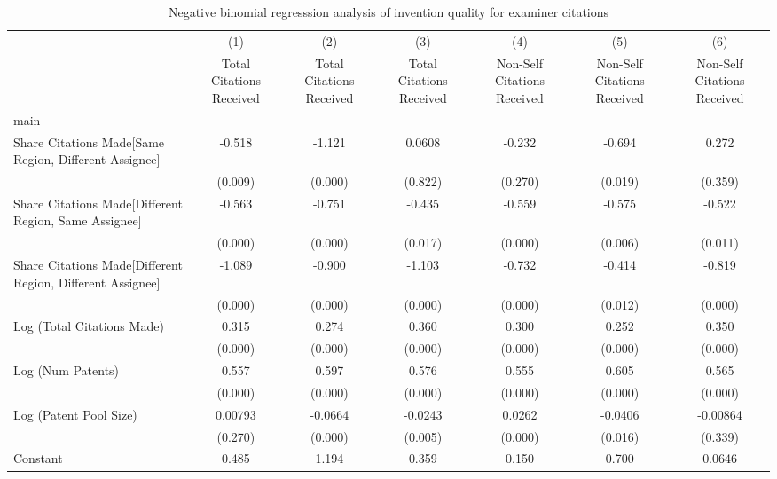 \begin{table}[htbp]\centering \caption{Negative binomial regresssion analysis of invention quality for examiner citations  \label{e.model123192021}} \begin{tabular}{l*{6}{c}} \hline\hline
                &\multicolumn{1}{c}{(1)}&\multicolumn{1}{c}{(2)}&\multicolumn{1}{c}{(3)}&\multicolumn{1}{c}{(4)}&\multicolumn{1}{c}{(5)}&\multicolumn{1}{c}{(6)}\\
                &\multicolumn{1}{c}{Total Citations Received}&\multicolumn{1}{c}{Total Citations Received}&\multicolumn{1}{c}{Total Citations Received}&\multicolumn{1}{c}{Non-Self Citations Received}&\multicolumn{1}{c}{Non-Self Citations Received}&\multicolumn{1}{c}{Non-Self Citations Received}\\
\hline
main            &         &         &         &         &         &         \\
Share Citations Made[Same Region, Different Assignee]&   -0.518&   -1.121&   0.0608&   -0.232&   -0.694&    0.272\\
                &  (0.009)&  (0.000)&  (0.822)&  (0.270)&  (0.019)&  (0.359)\\
Share Citations Made[Different Region, Same Assignee]&   -0.563&   -0.751&   -0.435&   -0.559&   -0.575&   -0.522\\
                &  (0.000)&  (0.000)&  (0.017)&  (0.000)&  (0.006)&  (0.011)\\
Share Citations Made[Different Region, Different Assignee]&   -1.089&   -0.900&   -1.103&   -0.732&   -0.414&   -0.819\\
                &  (0.000)&  (0.000)&  (0.000)&  (0.000)&  (0.012)&  (0.000)\\
Log (Total Citations Made)&    0.315&    0.274&    0.360&    0.300&    0.252&    0.350\\
                &  (0.000)&  (0.000)&  (0.000)&  (0.000)&  (0.000)&  (0.000)\\
Log (Num Patents)&    0.557&    0.597&    0.576&    0.555&    0.605&    0.565\\
                &  (0.000)&  (0.000)&  (0.000)&  (0.000)&  (0.000)&  (0.000)\\
Log (Patent Pool Size)&  0.00793&  -0.0664&  -0.0243&   0.0262&  -0.0406& -0.00864\\
                &  (0.270)&  (0.000)&  (0.005)&  (0.000)&  (0.016)&  (0.339)\\
Constant        &    0.485&    1.194&    0.359&    0.150&    0.700&   0.0646\\

\end{tabular}
\end{table}
